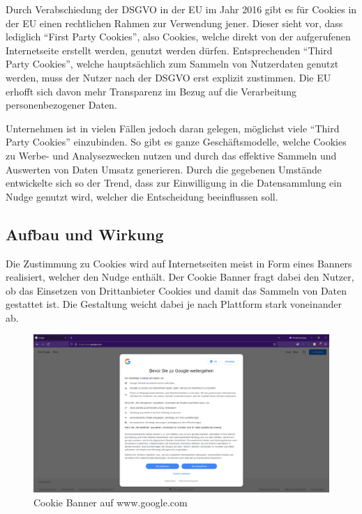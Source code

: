 Durch Verabschiedung der \ac{DSGVO} in der \ac{EU} im Jahr 2016  gibt es für Cookies in der \ac{EU} einen rechtlichen Rahmen zur Verwendung jener. Dieser sieht vor, dass lediglich ``First Party Cookies'', also Cookies, welche direkt von der aufgerufenen Internetseite erstellt werden, genutzt werden dürfen. Entsprechenden ``Third Party Cookies'', welche hauptsächlich zum Sammeln von Nutzerdaten genutzt werden, muss der Nutzer nach der \ac{DSGVO} erst explizit zustimmen. Die \ac{EU} erhofft sich davon mehr Transparenz im Bezug auf die Verarbeitung personenbezogener Daten. 

Unternehmen ist in vielen Fällen jedoch daran gelegen, möglichst viele ``Third Party Cookies'' einzubinden. So gibt es ganze Geschäftsmodelle, welche Cookies zu Werbe- und Analysezwecken nutzen und durch das effektive Sammeln und Auswerten von Daten Umsatz generieren. Durch die gegebenen Umstände entwickelte sich so der Trend, dass zur Einwilligung in die Datensammlung ein Nudge genutzt wird, welcher die Entscheidung beeinflussen soll.

\subsection{Aufbau und Wirkung}
Die Zustimmung zu Cookies wird auf Internetseiten meist in Form eines Banners realisiert, welcher den Nudge enthält. Der Cookie Banner fragt dabei den Nutzer, ob das Einsetzen von Drittanbieter Cookies und damit das Sammeln von Daten gestattet ist. Die Gestaltung weicht dabei je nach Plattform stark voneinander ab.

\begin{figure}[ht]
    \centering
    \includegraphics[width=1\textwidth]{Bilder/Google_Banner.png}
    \caption{Cookie Banner auf www.google.com}
    \label{fig:Google-Cookie}
\end{figure}

